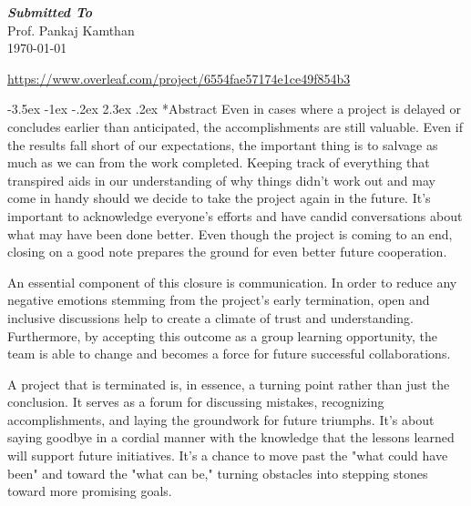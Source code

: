 \documentclass[11pt]{article}
\makeatletter
\let\oldtableofcontents\tableofcontents
\renewcommand{\tableofcontents}{%
         \begingroup
        \hypersetup{linkcolor=black} %
         \oldtableofcontents
        \endgroup
    }
\renewcommand\section{\@startsection {section}{1}{\z@}%
                                       {-3.5ex \@plus -1ex \@minus -.2ex}%
                                       {2.3ex \@plus.2ex}%
                                       {\normalfont\fontfamily{phv}\fontsize{14}{17}\bfseries}}
\makeatother
\begin{document}
{\begin{titlepage}
\begin{center}
\begin{Large}
            \textbf{\emph{Submitted To}} \\
            \vspace*{0.2in}
            Prof. Pankaj Kamthan\\
            \vspace*{0.2in}
            \today
            \end{Large}
            \end{center}
            \begin{center}
            \vspace*{0.7in}
            \href{https://www.overleaf.com/project/6554fae57174e1ce49f854b3}{https://www.overleaf.com/project/6554fae57174e1ce49f854b3}\end{center}
            \end{titlepage}

\pagebreak
\section*{Abstract} 
        \hspace{1cm} Even in cases where a project is delayed or concludes earlier than anticipated, the accomplishments are still valuable. Even if the results fall short of our expectations, the important thing is to salvage as much as we can from the work completed. Keeping track of everything that transpired aids in our understanding of why things didn't work out and may come in handy should we decide to take the project again in the future. It's important to acknowledge everyone's efforts and have candid conversations about what may have been done better. Even though the project is coming to an end, closing on a good note prepares the ground for even better future cooperation.

        An essential component of this closure is communication. In order to reduce any negative emotions stemming from the project's early termination, open and inclusive discussions help to create a climate of trust and understanding. Furthermore, by accepting this outcome as a group learning opportunity, the team is able to change and becomes a force for future successful collaborations.
        
        A project that is terminated is, in essence, a turning point rather than just the conclusion. It serves as a forum for discussing mistakes, recognizing accomplishments, and laying the groundwork for future triumphs. It's about saying goodbye in a cordial manner with the knowledge that the lessons learned will support future initiatives. It's a chance to move past the "what could have been" and toward the "what can be," turning obstacles into stepping stones toward more promising goals. 
\pagebreak
\tableofcontents
\newpage
    

}
\end{document}
